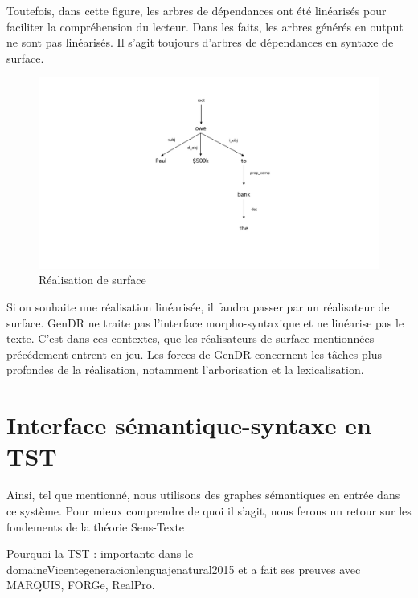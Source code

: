 Toutefois, dans cette figure, les arbres de dépendances ont été linéarisés pour faciliter la compréhension du lecteur. Dans les faits, les arbres générés en output ne sont pas linéarisés. Il s'agit toujours d'arbres de dépendances en syntaxe de surface. 

\begin{figure}[htb]
	\centering
	\includegraphics[width=1\textwidth, trim = {0cm 2cm 0cm 2cm},clip]{ch3/figs/realsurfex.pdf}
	\caption{Réalisation de surface}
	\label{fig:realsurfex}
\end{figure}

Si on souhaite une réalisation linéarisée,  il faudra passer par un réalisateur de surface. GenDR ne traite pas l'interface morpho-syntaxique et ne linéarise pas le texte. C'est dans ces contextes, que les réalisateurs de surface mentionnées précédement entrent en jeu. Les forces de GenDR concernent les tâches plus profondes de la réalisation, notamment l'arborisation et la lexicalisation.


\section{Interface sémantique-syntaxe en TST}

Ainsi, tel que mentionné, nous utilisons des graphes sémantiques en entrée dans ce système. Pour mieux comprendre de quoi il s'agit, nous ferons un retour sur les fondements de la théorie Sens-Texte

Pourquoi la TST : importante dans le domaine{Vicentegeneracionlenguajenatural2015} et a fait ses preuves avec MARQUIS, FORGe, RealPro.

